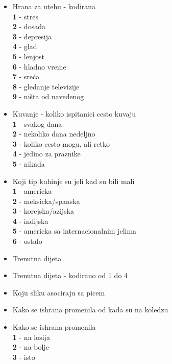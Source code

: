 \documentclass[12pt,a4paper]{article}
\begin{document}
\begin{itemize}
  \item Hrana za utehu - kodirana\\
   \textbf{1} - stres\\
   \textbf{2} - dosada\\
   \textbf{3} - depresija\\
   \textbf{4} - glad\\
   \textbf{5} - lenjost\\
   \textbf{6} - hladno vreme \\
   \textbf{7} - sre\'  ca\\ 
   \textbf{8} - gledanje televizije\\
   \textbf{9} - ni\v sta od navedenog\\
   \item Kuvanje - koliko ispitanici cesto kuvaju\\
    \textbf{1} - svakog dana\\
    \textbf{2} - nekoliko dana nedeljno\\
    \textbf{3} - koliko cesto mogu, ali retko\\
    \textbf{4} - jedino za praznike\\
    \textbf{5} - nikada\\
  \item Koji tip kuhinje su jeli kad su bili mali\\
    \textbf{1} - americka\\
    \textbf{2} - meksicka/spanska\\
    \textbf{3} - korejska/azijska\\
    \textbf{4} - indijska\\
    \textbf{5} - americka sa internacionalnim jelima\\
    \textbf{6} - ostalo\\
  \item Trenutna dijeta\\
  \item Trenutna dijeta - kodirano od 1 do 4\\
  \item Koju sliku asociraju sa picem\\
  \item Kako se ishrana promenila od kada su na koledzu\\
  \item Kako se ishrana promenila\\
    \textbf{1} - na losija\\
    \textbf{2} - na bolje\\
    \textbf{3} - isto\\

\end{itemize}
\end{document}
